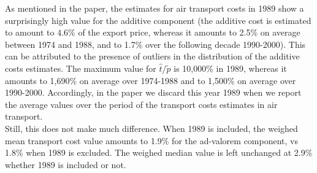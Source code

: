 \documentclass[11pt,twoside, authoryear]{elsarticle}
\begin{document}
As mentioned in the paper, the estimates for air transport costs in 1989 show a surprisingly high value for the additive component (the additive cost is estimated to amount to $4.6\%$ of the export price, whereas it amounts to 2.5\% on average between 1974 and 1988, and to 1.7\% over the following decade 1990-2000). This can be attributed to the presence of outliers in the distribution of the additive costs estimates. The maximum value for $\widehat{t}/\widetilde{p}$ is 10,000\% in 1989, whereas it amounts to 1,690\% on average over 1974-1988 and to 1,500\% on average over 1990-2000. Accordingly, in the paper we discard this year 1989 when we report the average values over the period of the transport costs estimates in air transport.\\
Still, this does not make much difference. When 1989 is included, the weighed mean transport cost value amounts to 1.9\% for the ad-valorem component, vs 1.8\% when 1989 is excluded. The weighed median value is left unchanged at 2.9\% whether 1989 is included or not.
\end{document}
